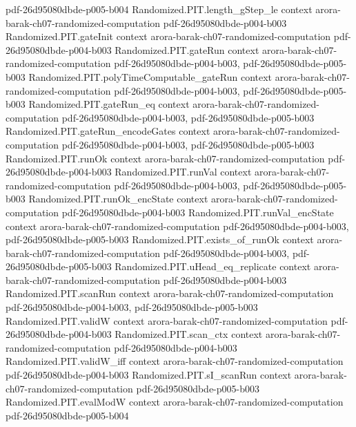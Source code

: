 \begin{theorem}
  {pdf-26d95080dbde-p005-b004}
\proofstep
  {Randomized.PIT.length_gStep_le}
  {context}
  {arora-barak-ch07-randomized-computation}
  {pdf-26d95080dbde-p004-b003}
\proofstep
  {Randomized.PIT.gateInit}
  {context}
  {arora-barak-ch07-randomized-computation}
  {pdf-26d95080dbde-p004-b003}
\proofstep
  {Randomized.PIT.gateRun}
  {context}
  {arora-barak-ch07-randomized-computation}
  {pdf-26d95080dbde-p004-b003,
    pdf-26d95080dbde-p005-b003}
\proofstep
  {Randomized.PIT.polyTimeComputable_gateRun}
  {context}
  {arora-barak-ch07-randomized-computation}
  {pdf-26d95080dbde-p004-b003,
    pdf-26d95080dbde-p005-b003}
\proofstep
  {Randomized.PIT.gateRun_eq}
  {context}
  {arora-barak-ch07-randomized-computation}
  {pdf-26d95080dbde-p004-b003,
    pdf-26d95080dbde-p005-b003}
\proofstep
  {Randomized.PIT.gateRun_encodeGates}
  {context}
  {arora-barak-ch07-randomized-computation}
  {pdf-26d95080dbde-p004-b003,
    pdf-26d95080dbde-p005-b003}
\proofstep
  {Randomized.PIT.runOk}
  {context}
  {arora-barak-ch07-randomized-computation}
  {pdf-26d95080dbde-p004-b003}
\proofstep
  {Randomized.PIT.runVal}
  {context}
  {arora-barak-ch07-randomized-computation}
  {pdf-26d95080dbde-p004-b003,
    pdf-26d95080dbde-p005-b003}
\proofstep
  {Randomized.PIT.runOk_encState}
  {context}
  {arora-barak-ch07-randomized-computation}
  {pdf-26d95080dbde-p004-b003}
\proofstep
  {Randomized.PIT.runVal_encState}
  {context}
  {arora-barak-ch07-randomized-computation}
  {pdf-26d95080dbde-p004-b003,
    pdf-26d95080dbde-p005-b003}
\proofstep
  {Randomized.PIT.exists_of_runOk}
  {context}
  {arora-barak-ch07-randomized-computation}
  {pdf-26d95080dbde-p004-b003,
    pdf-26d95080dbde-p005-b003}
\proofstep
  {Randomized.PIT.uHead_eq_replicate}
  {context}
  {arora-barak-ch07-randomized-computation}
  {pdf-26d95080dbde-p004-b003}
\proofstep
  {Randomized.PIT.scanRun}
  {context}
  {arora-barak-ch07-randomized-computation}
  {pdf-26d95080dbde-p004-b003,
    pdf-26d95080dbde-p005-b003}
\proofstep
  {Randomized.PIT.validW}
  {context}
  {arora-barak-ch07-randomized-computation}
  {pdf-26d95080dbde-p004-b003}
\proofstep
  {Randomized.PIT.scan_ctx}
  {context}
  {arora-barak-ch07-randomized-computation}
  {pdf-26d95080dbde-p004-b003}
\proofstep
  {Randomized.PIT.validW_iff}
  {context}
  {arora-barak-ch07-randomized-computation}
  {pdf-26d95080dbde-p004-b003}
\proofstep
  {Randomized.PIT.sI_scanRun}
  {context}
  {arora-barak-ch07-randomized-computation}
  {pdf-26d95080dbde-p005-b003}
\proofstep
  {Randomized.PIT.evalModW}
  {context}
  {arora-barak-ch07-randomized-computation}
  {pdf-26d95080dbde-p005-b004}

\end{theorem}
